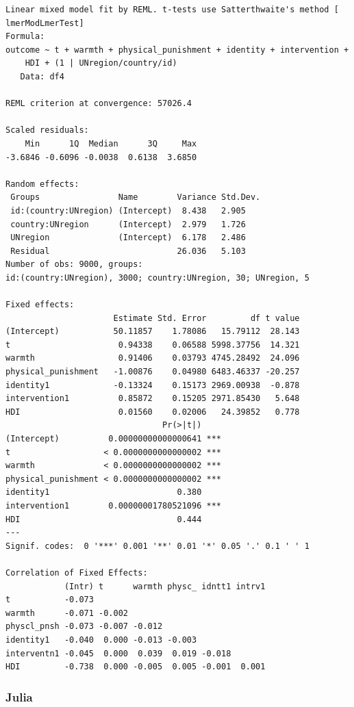 \documentclass[
  letterpaper,
  DIV=11,
  numbers=noendperiod]{scrreprt}
\begin{document}
\begin{verbatim}
Linear mixed model fit by REML. t-tests use Satterthwaite's method [
lmerModLmerTest]
Formula: 
outcome ~ t + warmth + physical_punishment + identity + intervention +  
    HDI + (1 | UNregion/country/id)
   Data: df4

REML criterion at convergence: 57026.4

Scaled residuals: 
    Min      1Q  Median      3Q     Max 
-3.6846 -0.6096 -0.0038  0.6138  3.6850 

Random effects:
 Groups                Name        Variance Std.Dev.
 id:(country:UNregion) (Intercept)  8.438   2.905   
 country:UNregion      (Intercept)  2.979   1.726   
 UNregion              (Intercept)  6.178   2.486   
 Residual                          26.036   5.103   
Number of obs: 9000, groups:  
id:(country:UNregion), 3000; country:UNregion, 30; UNregion, 5

Fixed effects:
                      Estimate Std. Error         df t value
(Intercept)           50.11857    1.78086   15.79112  28.143
t                      0.94338    0.06588 5998.37756  14.321
warmth                 0.91406    0.03793 4745.28492  24.096
physical_punishment   -1.00876    0.04980 6483.46337 -20.257
identity1             -0.13324    0.15173 2969.00938  -0.878
intervention1          0.85872    0.15205 2971.85430   5.648
HDI                    0.01560    0.02006   24.39852   0.778
                                Pr(>|t|)    
(Intercept)          0.00000000000000641 ***
t                   < 0.0000000000000002 ***
warmth              < 0.0000000000000002 ***
physical_punishment < 0.0000000000000002 ***
identity1                          0.380    
intervention1        0.00000001780521096 ***
HDI                                0.444    
---
Signif. codes:  0 '***' 0.001 '**' 0.01 '*' 0.05 '.' 0.1 ' ' 1

Correlation of Fixed Effects:
            (Intr) t      warmth physc_ idntt1 intrv1
t           -0.073                                   
warmth      -0.071 -0.002                            
physcl_pnsh -0.073 -0.007 -0.012                     
identity1   -0.040  0.000 -0.013 -0.003              
interventn1 -0.045  0.000  0.039  0.019 -0.018       
HDI         -0.738  0.000 -0.005  0.005 -0.001  0.001
\end{verbatim}

\subsubsection{Julia}
\end{document}

